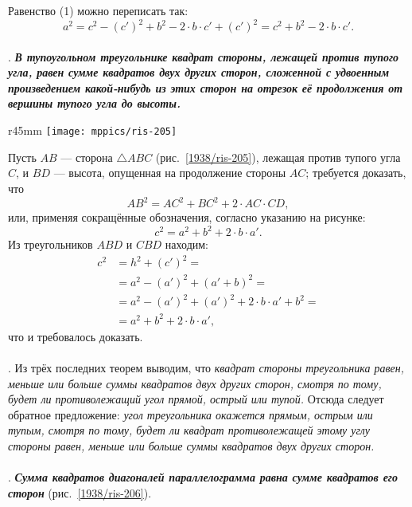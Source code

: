 Равенство (1) можно переписать так:
\[a^2=c^2-(c')^2+b^2-2\cdot b\cdot c'+(c')^2=c^2+b^2-2\cdot b\cdot c'.\]

\paragraph{}\label{1938/195}
\mbox{.}
\textbf{\emph{В тупоугольном треугольнике квадрат стороны, лежащей против тупого угла, равен сумме квадратов двух других сторон, сложенной с удвоенным произведением какой-нибудь из этих сторон на отрезок её продолжения от вершины тупого угла до высоты.}}


\begin{wrapfigure}{r}{45mm}
\vskip-5mm
\centering
\texttt{[image: mppics/ris-205]}
\caption{}\label{1938/ris-205}
\end{wrapfigure}


Пусть $AB$ — сторона $\triangle ABC$ (рис.~\ref{1938/ris-205}), лежащая против тупого угла $C$, и $BD$ — высота, опущенная на продолжение стороны $AC$;
требуется доказать, что
\[AB^2=AC^2+BC^2+2\cdot AC \cdot  CD,\]
или, применяя сокращённые обозначения, согласно указанию на рисунке:
\[c^2=a^2+b^2+2\cdot b\cdot a'.\]
Из треугольников $ABD$ и $CBD$ находим:
\begin{align*}
c^2&=h^2+(c')^2=
\\
&=a^2-(a')^2+(a'+b)^2=
\\
&=a^2-(a')^2+(a')^2+2\cdot b\cdot a'+b^2=
\\
&=a^2+b^2+2\cdot b\cdot a',
\end{align*}
что и требовалось доказать.

\paragraph{}\label{1938/196}
.
Из трёх последних теорем выводим, что \emph{квадрат стороны треугольника равен, меньше или больше суммы квадратов двух других сторон, смотря по тому, будет ли противолежащий угол прямой, острый или тупой.}
Отсюда следует обратное предложение:
\emph{угол треугольника окажется прямым, острым или тупым, смотря по тому, будет ли квадрат противолежащей этому углу стороны равен, меньше или больше суммы квадратов двух других сторон.}

\paragraph{}\label{1938/197}
.
\textbf{\emph{Сумма квадратов диагоналей параллелограмма равна сумме квадратов его сторон}} (рис.~\ref{1938/ris-206}).

